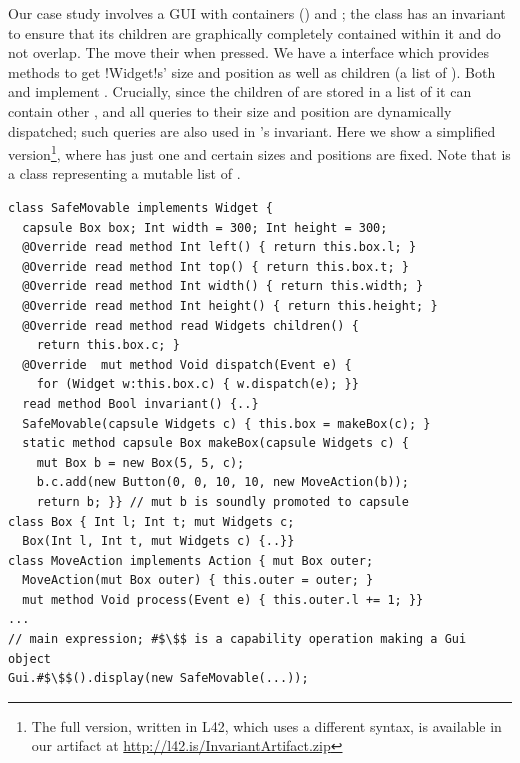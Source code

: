 Our case study involves a GUI with containers (\Q@SafeMovable@s) and \Q@Button@s;
the \Q@SafeMovable@ class has an invariant to ensure that its children are graphically completely contained within it and do not overlap. The \Q@Button@s move their \Q@SafeMovable@ when pressed. We have a \Q@Widget@ interface which provides methods to get \Q!Widget!s' size and position as well as children (a list of \Q@Widget@s). Both \Q@SafeMovable@s and \Q@Button@s implement \Q@Widget@. Crucially, since the children of \Q@SafeMovable@ are stored in a list of \Q@Widget@s it can contain other \Q@SafeMovable@s, and all queries to their size and position are dynamically dispatched; such queries are also used in \Q@SafeMovable@'s invariant.
Here we show a simplified version\footnote{The full version, written in L42, which uses a different syntax, is available in our artifact at \url{http://l42.is/InvariantArtifact.zip}}, where  \Q@SafeMovable@ has just one \Q@Button@ and certain sizes and positions are fixed. Note that \Q@Widgets@ is a class representing a mutable list of \Q@mut@ \Q@Widget@s.
\begin{lstlisting}
class SafeMovable implements Widget {
  capsule Box box; Int width = 300; Int height = 300;
  @Override read method Int left() { return this.box.l; }
  @Override read method Int top() { return this.box.t; }
  @Override read method Int width() { return this.width; }
  @Override read method Int height() { return this.height; }
  @Override read method read Widgets children() {
    return this.box.c; }
  @Override  mut method Void dispatch(Event e) {
    for (Widget w:this.box.c) { w.dispatch(e); }}
  read method Bool invariant() {..}
  SafeMovable(capsule Widgets c) { this.box = makeBox(c); }
  static method capsule Box makeBox(capsule Widgets c) {
    mut Box b = new Box(5, 5, c);
    b.c.add(new Button(0, 0, 10, 10, new MoveAction(b));
    return b; }} // mut b is soundly promoted to capsule
class Box { Int l; Int t; mut Widgets c;
  Box(Int l, Int t, mut Widgets c) {..}}
class MoveAction implements Action { mut Box outer;
  MoveAction(mut Box outer) { this.outer = outer; }
  mut method Void process(Event e) { this.outer.l += 1; }}
...
// main expression; #$\$$ is a capability operation making a Gui object
Gui.#$\$$().display(new SafeMovable(...));
\end{lstlisting}

